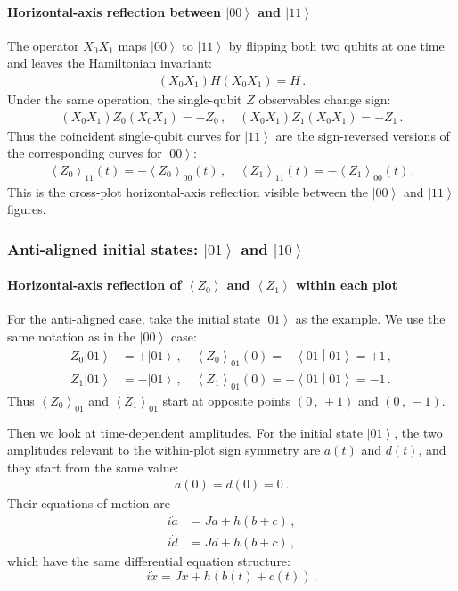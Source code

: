 \documentclass[11pt]{article}
\numberwithin{equation}{section}
\newcommand{\ket}[1]{\left| #1 \right\rangle} %
\newcommand{\braket}[2]{\left\langle #1 \middle| #2 \right\rangle} %
\newcommand{\ev}[1]{\left\langle #1 \right\rangle} %
\begin{document}
\paragraph{Horizontal-axis reflection between $\ket{00}$ and $\ket{11}$}
The operator $X_0X_1$ maps $\ket{00}$ to $\ket{11}$ by flipping both two qubits at one time and leaves the Hamiltonian invariant:
\begin{align*}
  (X_0 X_1) H (X_0 X_1) = H \,.
\end{align*}
Under the same operation, the single-qubit $Z$ observables change sign:
\begin{align*}
  (X_0 X_1) Z_0(X_0 X_1 )= -Z_0 \,,  \quad
  (X_0 X_1) Z_1 (X_0 X_1) = -Z_1 \,.
\end{align*}
Thus the coincident single-qubit curves for $\ket{11}$ are the sign-reversed versions of the corresponding curves for $\ket{00}$:
\begin{align}
  \ev{Z_0}_{11}(t) = -\ev{Z_0}_{00}(t)\,, \quad
  \ev{Z_1}_{11}(t) = -\ev{Z_1}_{00}(t)\,.
\end{align}
This is the cross-plot horizontal-axis reflection visible between the $\ket{00}$ and $\ket{11}$ figures.

\subsubsection{Anti-aligned initial states: \texorpdfstring{$\ket{01}$ and $\ket{10}$}{|01> and |10>}}

\paragraph{Horizontal-axis reflection of $\ev{Z_0}$ and $\ev{Z_1}$ within each plot}
For the anti-aligned case, take the initial state $\ket{01}$ as the example. We use the same notation as in the $\ket{00}$ case:
\begin{align*}
  Z_0\ket{01} &= +\ket{01} \,,\quad
  \ev{Z_0}_{01}(0)=+\braket{01}{01}=+1 \,,\\
  Z_1\ket{01} &= -\ket{01} \,,\quad
  \ev{Z_1}_{01}(0)=-\braket{01}{01}=-1 \,.
\end{align*}
Thus $\ev{Z_0}_{01}$ and $\ev{Z_1}_{01}$ start at opposite points
$(0 \,,\, +1)$ and $(0 \,,\, -1)$.

Then we look at time-dependent amplitudes. For the initial state $\ket{01}$, the two amplitudes relevant to the within-plot sign symmetry are $a(t)$ and $d(t)$, and they start from the same value:
\begin{align*}
  a(0)=d(0)=0 \,.
\end{align*}
Their equations of motion are
\begin{align*}
    i\dot{a} &= Ja + h(b + c) \,,\\
    i\dot{d} &= Jd + h(b + c) \,,
\end{align*}
which have the same differential equation structure:
$$i\dot{x} = Jx + h\left( b(t) + c(t) \right)\,.$$
\end{document}
